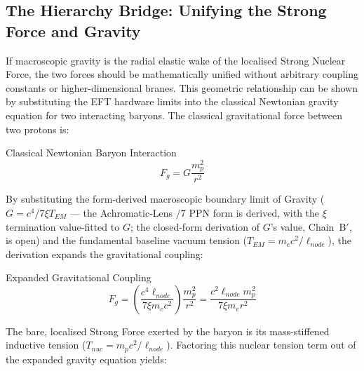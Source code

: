 \subsection{The Hierarchy Bridge: Unifying the Strong Force and Gravity}

If macroscopic gravity is the radial elastic wake of the localised Strong Nuclear Force, the two forces should be mathematically unified without arbitrary coupling constants or higher-dimensional branes. This geometric relationship can be shown by substituting the EFT hardware limits into the classical Newtonian gravity equation for two interacting baryons. 
The classical gravitational force between two protons is:
\begin{resultbox}{Classical Newtonian Baryon Interaction}
\begin{equation}
F_g = G \frac{m_p^2}{r^2}
\end{equation}
\end{resultbox}

By substituting the form-derived macroscopic boundary limit of Gravity ($G = c^4 / 7\xi T_{EM}$ --- the Achromatic-Lens $/7$ PPN form is derived, with the $\xi$ termination value-fitted to $G$; the closed-form derivation of $G$'s value, Chain~B$'$, is open) and the fundamental baseline vacuum tension ($T_{EM} = m_e c^2 / \ell_{node}$), the derivation expands the gravitational coupling:
\begin{resultbox}{Expanded Gravitational Coupling}
\begin{equation}
F_g = \left( \frac{c^4 \ell_{node}}{7 \xi m_e c^2} \right) \frac{m_p^2}{r^2} = \frac{c^2 \ell_{node} m_p^2}{7 \xi m_e r^2}
\end{equation}
\end{resultbox}

The bare, localised Strong Force exerted by the baryon is its mass-stiffened inductive tension ($T_{nuc} = m_p c^2 / \ell_{node}$). Factoring this nuclear tension term out of the expanded gravity equation yields:

